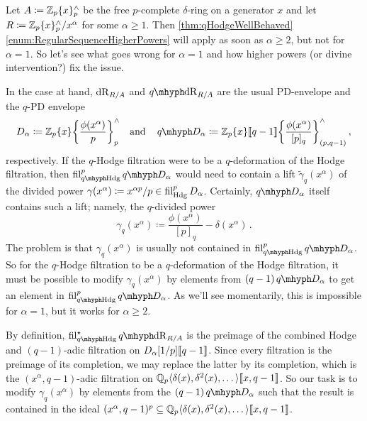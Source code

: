 \documentclass[DIV=12,numbers=enddot,leqno,bibliography=totoc]{scrartcl}
\begin{document}
	\begin{exm}\label{exm:MainSpecialCase}
		Let $A\coloneqq \IZ_p\{x\}_p^\complete$ be the free $p$-complete $\delta$-ring on a generator $x$ and let $R\coloneqq\IZ_p\{x\}_p^\complete/x^\alpha$ for some $\alpha\geqslant 1$. Then \cref{thm:qHodgeWellBehaved}\cref{enum:RegularSequenceHigherPowers} will apply as soon as $\alpha\geqslant2$, but not for $\alpha=1$. So let's see what goes wrong for $\alpha=1$ and how higher powers (or divine intervention?) fix the issue.
		
		In the case at hand, $\mathrm{dR}_{R/A}$ and $\qdeRham_{R/A}$ are the usual PD-envelope and the $q$-PD envelope
		\begin{equation*}
			D_\alpha\coloneqq \IZ_p\{x\}\left\{\frac{\phi(x^\alpha)}{p}\right\}_p^\complete\quad\text{and}\quad\q D_\alpha\coloneqq \IZ_p\{x\}\qpower\left\{\frac{\phi(x^\alpha)}{[p]_q}\right\}_{(p,q-1)}^\complete\,,
		\end{equation*}
		respectively. If the $q$-Hodge filtration were to be a $q$-deformation of the Hodge filtration, then $\fil_{\qHodge}^p\q D_\alpha$ would need to contain a lift $\widetilde{\gamma}_q(x^\alpha)$  of the divided power $\gamma(x^\alpha)\coloneqq x^{\alpha p}/p\in \fil_{\Hodge}^pD_\alpha$. Certainly, $\q D_\alpha$ itself contains such a lift; namely, the $q$-divided power
		\begin{equation*}
			\gamma_q(x^\alpha)\coloneqq\frac{\phi(x^\alpha)}{[p]_q}-\delta(x^\alpha)\,.
		\end{equation*}
		The problem is that $\gamma_q(x^\alpha)$ is usually not contained in $\fil_{\qHodge}^p\q D_\alpha$. So for the $q$-Hodge filtration to be a $q$-deformation of the Hodge filtration, it must be possible to modify $\gamma_q(x^\alpha)$ by elements from $(q-1)\q D_\alpha$ to get an element in $\fil_{\qHodge}^p\q D_\alpha$. As we'll see momentarily, this is impossible for $\alpha=1$, but it works for $\alpha\geqslant 2$.
		
		By definition, $\fil_{\qHodge}^\star \qdeRham_{R/A}$ is the preimage of the combined Hodge and $(q-1)$-adic filtration on $D_\alpha[1/p]\llbracket q-1\rrbracket$. Since every filtration is the preimage of its completion, we may replace the latter by its completion, which is the $(x^\alpha,q-1)$-adic filtration on $\mathbb{Q}_p\langle \delta(x),\delta^2(x),\dotsc\rangle\llbracket x,q-1\rrbracket$. So our task is to modify $\gamma_q(x^\alpha)$ by elements from the $(q-1)\q D_\alpha$ such that the result is contained in the ideal $(x^\alpha,q-1)^p\subseteq \mathbb{Q}_p\langle \delta(x),\delta^2(x),\dotsc\rangle\llbracket x,q-1\rrbracket$.
		

\end{exm}
\end{document}
